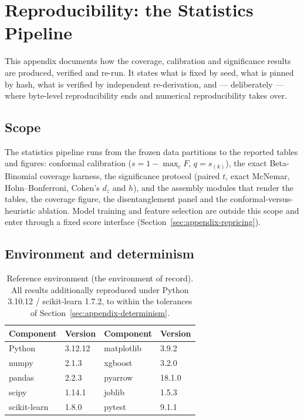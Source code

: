 
\section{Reproducibility: the Statistics Pipeline}
\label{sec:appendix-repro}

This appendix documents how the coverage, calibration and significance results are produced, verified and
re-run. It states what is fixed by seed, what is pinned by hash, what is verified by independent
re-derivation, and --- deliberately --- where byte-level reproducibility ends and numerical reproducibility
takes over.

\subsection{Scope}

The statistics pipeline runs from the frozen data partitions to the reported tables and figures: conformal
calibration ($s = 1 - \max_c F$, $q = s_{(k)}$), the exact Beta-Binomial coverage harness, the significance
protocol (paired $t$, exact McNemar, Holm--Bonferroni, Cohen's $d_z$ and $h$), and the assembly modules that
render the tables, the coverage figure, the disentanglement panel and the conformal-versus-heuristic
ablation. Model training and feature selection are outside this scope and enter through a fixed score
interface (Section~\ref{sec:appendix-repricing}).

\subsection{Environment and determinism}

\begin{table}[t]
\centering
\caption{Reference environment (the environment of record). All results additionally reproduced under
Python 3.10.12 / scikit-learn 1.7.2, to within the tolerances of Section~\ref{sec:appendix-determinism}.}
\label{tab:env}
\begin{tabular}{ll@{\qquad}ll}
\toprule
Component & Version & Component & Version \\
\midrule
Python       & 3.12.12 & matplotlib & 3.9.2  \\
numpy        & 2.1.3   & xgboost    & 3.2.0  \\
pandas       & 2.2.3   & pyarrow    & 18.1.0 \\
scipy        & 1.14.1  & joblib     & 1.5.3  \\
scikit-learn & 1.8.0   & pytest     & 9.1.1  \\
\bottomrule
\end{tabular}
\end{table}

